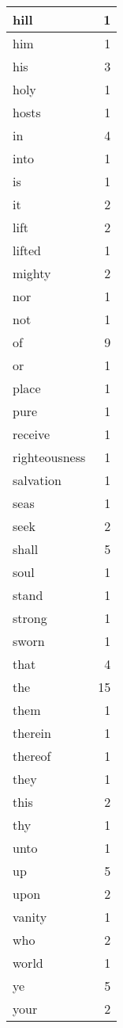 \begin{center}
\begin{longtable}{l|r}
hill & 1 \\ \hline
him & 1 \\ \hline
his & 3 \\ \hline
holy & 1 \\ \hline
hosts & 1 \\ \hline
in & 4 \\ \hline
into & 1 \\ \hline
is & 1 \\ \hline
it & 2 \\ \hline
lift & 2 \\ \hline
lifted & 1 \\ \hline
mighty & 2 \\ \hline
nor & 1 \\ \hline
not & 1 \\ \hline
of & 9 \\ \hline
or & 1 \\ \hline
place & 1 \\ \hline
pure & 1 \\ \hline
receive & 1 \\ \hline
righteousness & 1 \\ \hline
salvation & 1 \\ \hline
seas & 1 \\ \hline
seek & 2 \\ \hline
shall & 5 \\ \hline
soul & 1 \\ \hline
stand & 1 \\ \hline
strong & 1 \\ \hline
sworn & 1 \\ \hline
that & 4 \\ \hline
the & 15 \\ \hline
them & 1 \\ \hline
therein & 1 \\ \hline
thereof & 1 \\ \hline
they & 1 \\ \hline
this & 2 \\ \hline
thy & 1 \\ \hline
unto & 1 \\ \hline
up & 5 \\ \hline
upon & 2 \\ \hline
vanity & 1 \\ \hline
who & 2 \\ \hline
world & 1 \\ \hline
ye & 5 \\ \hline
your & 2 \\ \hline
\end{longtable}
\end{center}



